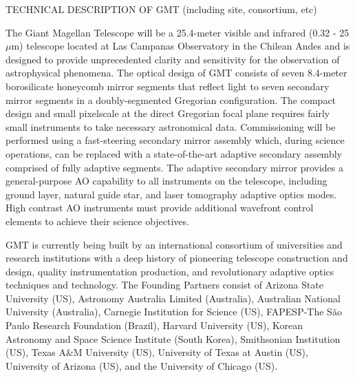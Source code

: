 \documentclass[12pt,preprint]{aastex}
\begin{document}
TECHNICAL DESCRIPTION OF GMT (including site, consortium, etc)

The Giant Magellan Telescope will be a 25.4-meter visible and infrared (0.32 - 25 $\mu$m) telescope located at Las Campanas Observatory in the Chilean Andes and is designed to provide unprecedented clarity and sensitivity for the observation of astrophysical phenomena. The optical design of GMT consists of seven 8.4-meter borosilicate honeycomb mirror segments that reflect light to seven secondary mirror segments in a doubly-segmented Gregorian configuration. The compact design and small pixelscale at the direct Gregorian focal plane requires fairly small instruments to take necessary astronomical data. Commissioning will be performed using a fast-steering secondary mirror assembly which, during science operations, can be replaced with a state-of-the-art adaptive secondary assembly comprised of fully adaptive segments. The adaptive secondary mirror provides a general-purpose AO capability to all instruments on the telescope, including ground layer, natural guide star, and laser tomography adaptive optics modes. High contrast AO instruments must provide additional wavefront control elements to achieve their science objectives.

GMT is currently being built by an international consortium of universities and research institutions with a deep history of pioneering telescope construction and design, quality instrumentation production, and revolutionary adaptive optics techniques and technology. The Founding Partners consist of Arizona State University (US), Astronomy Australia Limited (Australia), Australian National University (Australia), Carnegie Institution for Science (US), FAPESP-The S\~ao Paulo Research Foundation (Brazil), Harvard University (US), Korean Astronomy and Space Science Institute (South Korea), Smithsonian Institution (US), Texas A&M University (US), University of Texas at Austin (US), University of Arizona (US), and the University of Chicago (US).
\end{document}

